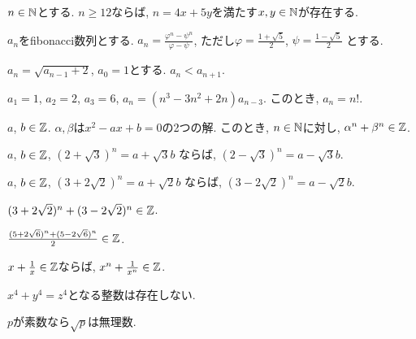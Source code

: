 \begin{prop}
$n\in\mathbb{N}$とする.
  $n\geq 12$ならば, $n=4x+5y$を満たす$x,y\in\mathbb{N}$が存在する.
\end{prop}


\begin{prop}
  $a_n$をfibonacci数列とする.
  $a_n=\frac{\varphi^n-\psi^n}{\varphi-\psi}$,
  ただし$\varphi=\frac{1+\sqrt{5}}{2}$,
  $\psi=\frac{1-\sqrt{5}}{2}$
  とする.
\end{prop}

\begin{prop}
  $a_n=\sqrt{a_{n-1}+2}$, $a_0=1$とする.
  $a_n<a_{n+1}$.
\end{prop}



\begin{prop}
  $a_1=1$, $a_2=2$, $a_3=6$,
  $a_n=(n^3-3n^2+2n)a_{n-3}$.
  このとき, $a_n=n!$.
\end{prop}



\begin{prop}
  $a$, $b\in\mathbb{Z}$.
  $\alpha, \beta$は$x^2-ax+b=0$の2つの解.
  このとき, $n\in\mathbb{N}$に対し,
  $\alpha^n+\beta^n\in \mathbb{Z}$.
\end{prop}

\begin{prop}
  $a$, $b\in\mathbb{Z}$,  
  $(2+\sqrt{3})^n=a+\sqrt{3}b$
  ならば,
  $(2-\sqrt{3})^n=a-\sqrt{3}b$.
\end{prop}

\begin{prop}
  $a$, $b\in\mathbb{Z}$,  
  $(3+2\sqrt{2})^n=a+\sqrt{2}b$
  ならば,
  $(3-2\sqrt{2})^n=a-\sqrt{2}b$.
\end{prop}


\begin{prop}
  $(3+2\sqrt{2})^n+(3-2\sqrt{2})^n\in\mathbb{Z}$.
\end{prop}

\begin{prop}
  $\frac{(5+2\sqrt{6})^n+(5-2\sqrt{6})^n}{2}\in\mathbb{Z}$.
\end{prop}

\begin{prop}
  $x+\frac{1}{x}\in\mathbb{Z}$ならば, 
  $x^n+\frac{1}{x^n}\in\mathbb{Z}$.
\end{prop}


\begin{prop}
  $x^4+y^4=z^4$となる整数は存在しない.
\end{prop}

\begin{prop}
  $p$が素数なら$\sqrt{p}$は無理数.
\end{prop}

